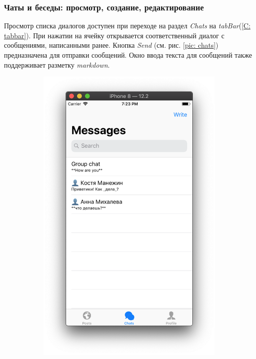 \documentclass[a4paper,12pt]{article}
\begin{document}
	\subsubsection{Чаты и беседы: просмотр, создание, редактирование}
	Просмотр списка диалогов доступен при переходе на раздел \textit{Chats} на \textit{tabBar}(\ref{C: tabbar}). При нажатии на ячейку открывается соответственный диалог с сообщениями, написанными ранее. Кнопка \textit{Send} (см. рис. \ref{pic: chats}) предназначена для отправки сообщений. Окно ввода текста для сообщений также поддерживает разметку \textit{markdown}.
		\begin{figure}[h!]
		\centering
		\begin{subfigure}[b]{0.3\linewidth}
			\includegraphics[width=\linewidth]{../includes/pmi/chats.png}

\end{subfigure}
\end{figure}
\end{document}
